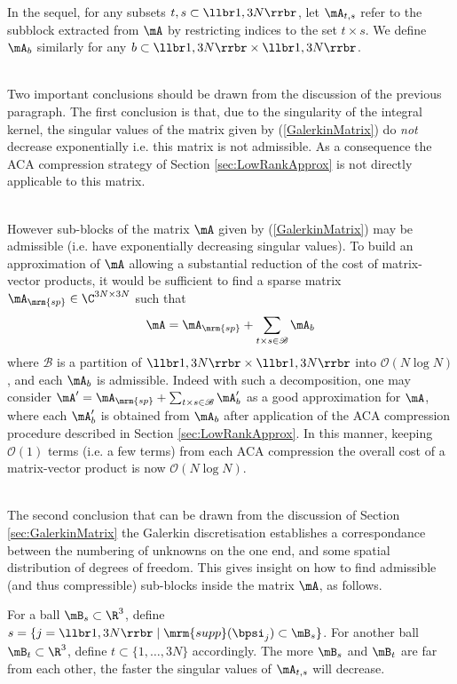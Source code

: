In the sequel, for any subsets $t,s\subset \llbr1,3N\rrbr$, let $\mA_{t,s}$ refer to the subblock extracted from $\mA$ 
by restricting indices to the set $t\times s$. We define $\mA_{b}$ similarly for any $b\subset \llbr 1,3N\rrbr\times \llbr 1,3N\rrbr$.

\quad\\
Two important conclusions should be drawn from the discussion of the previous paragraph. The first 
conclusion is that, due to the singularity of the integral kernel, the singular values of the matrix given 
by (\ref{GalerkinMatrix}) do \textit{not} decrease exponentially i.e. this matrix is not admissible. 
As a consequence the ACA compression strategy of Section \ref{sec:LowRankApprox} is not directly applicable 
to this matrix. 

\quad\\
However sub-blocks of the matrix $\mA$ given by (\ref{GalerkinMatrix}) may be admissible (i.e. have exponentially 
decreasing singular values). To build an approximation of $\mA$ allowing a substantial reduction of the cost of 
matrix-vector products, it would be sufficient to find a sparse matrix $\mA_{\mrm{sp}}\in \C^{3N\times 3N}$ such that 
$$
\mA = \mA_{\mrm{sp}} + \sum_{t\times s\in \mathscr{B}} \mA_{b}
$$
where $\mathscr{B}$ is a partition of $\llbr 1,3N\rrbr\times \llbr 1,3N\rrbr$ into $\mathcal{O}(N\log N)$, and each 
$\mA_{b}$ is admissible. Indeed with such a decomposition, one may consider $\mA' = \mA_{\mrm{sp}} + \sum_{t\times s\in \mathscr{B}} \mA_{b}'$
as a good approximation for $\mA$, where each $\mA_{b}'$ is obtained from $\mA_{b}$ after application of the ACA compression 
procedure described in Section \ref{sec:LowRankApprox}. In this manner, keeping $\mathcal{O}(1)$ terms (i.e. a few terms) from each 
ACA compression the overall cost of a matrix-vector product is now $\mathcal{O}(N\log N)$.





\quad\\
The second conclusion that can be drawn from the discussion of Section \ref{sec:GalerkinMatrix}  the Galerkin discretisation establishes 
a correspondance between the numbering of unknowns on the one end, and some spatial distribution of degrees of freedom. This gives insight 
on how to find admissible (and thus compressible) sub-blocks inside the matrix $\mA$, as follows.

For a ball $\mB_{s}\subset \R^{3}$, define $s = \{j = \llbr 1,3N\rrbr\;\vert \;\mrm{supp}(\bpsi_{j})\subset \mB_{s}\}$. 
For another ball $\mB_{t}\subset \R^{3}$, define $t\subset \{ 1,\dots,3N\}$ accordingly.  
The more $\mB_{s}$ and $\mB_{t}$ are far from each other, the faster the singular values of $\mA_{t,s}$ will decrease. 

